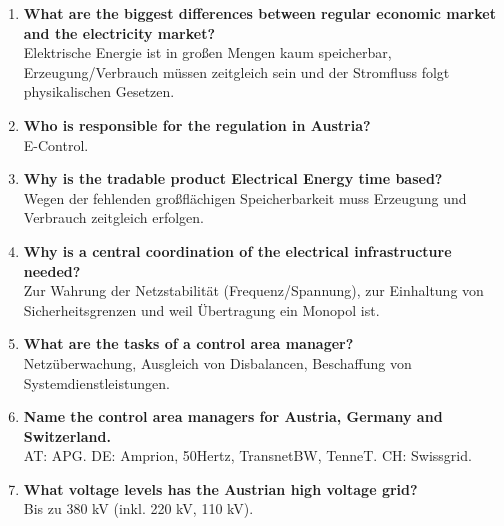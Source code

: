 \documentclass{article}
\begin{document}
\begin{enumerate}
    Mehr Wettbewerb, Effizienzsteigerung und Wahlfreiheit für Kunden.
    \item \textbf{What are the biggest differences between regular economic market and the electricity market?} \\
    Elektrische Energie ist in großen Mengen kaum speicherbar, Erzeugung/Verbrauch müssen zeitgleich sein und der Stromfluss folgt physikalischen Gesetzen.
    \item \textbf{Who is responsible for the regulation in Austria?} \\
    E-Control.
    \item \textbf{Why is the tradable product Electrical Energy time based?} \\
    Wegen der fehlenden großflächigen Speicherbarkeit muss Erzeugung und Verbrauch zeitgleich erfolgen.
    \item \textbf{Why is a central coordination of the electrical infrastructure needed?} \\
    Zur Wahrung der Netzstabilität (Frequenz/Spannung), zur Einhaltung von Sicherheitsgrenzen und weil Übertragung ein Monopol ist.
    \item \textbf{What are the tasks of a control area manager?} \\
    Netzüberwachung, Ausgleich von Disbalancen, Beschaffung von Systemdienstleistungen.
    \item \textbf{Name the control area managers for Austria, Germany and Switzerland.} \\
    AT: APG. DE: Amprion, 50Hertz, TransnetBW, TenneT. CH: Swissgrid.
    \item \textbf{What voltage levels has the Austrian high voltage grid?} \\
    Bis zu 380 kV (inkl. 220 kV, 110 kV).
\end{enumerate}
\end{document}
